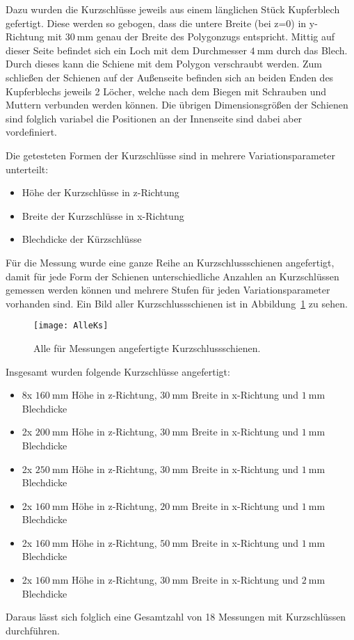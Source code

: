 Dazu wurden die Kurzschl\"usse jeweils aus einem l\"anglichen St\"uck Kupferblech gefertigt. Diese werden so gebogen, dass die untere Breite (bei z=0) in y-Richtung mit $\SI{30}{\milli\meter}$ genau der Breite des Polygonzugs entspricht. Mittig auf dieser Seite befindet sich ein Loch mit dem Durchmesser $\SI{4}{\milli\meter}$ durch das Blech. Durch dieses kann die Schiene mit dem Polygon verschraubt werden. Zum schlie\ss{}en der Schienen auf der Au\ss{}enseite befinden sich an beiden Enden des Kupferblechs jeweils 2 L\"ocher, welche nach dem Biegen mit Schrauben und Muttern verbunden werden k\"onnen. Die \"ubrigen Dimensionsgr\"o\ss{}en der Schienen sind folglich variabel die Positionen an der Innenseite sind dabei aber vordefiniert.
\par
Die getesteten Formen der Kurzschl\"usse sind in mehrere Variationsparameter unterteilt:
\begin{itemize}
	\item H\"ohe der Kurzschl\"usse in z-Richtung
	\item Breite der Kurzschl\"usse in x-Richtung
	\item Blechdicke der K\"urzschl\"usse
\end{itemize}

F\"ur die Messung wurde eine ganze Reihe an Kurzschlussschienen angefertigt, damit f\"ur jede Form der Schienen unterschiedliche Anzahlen an Kurzschl\"ussen gemessen werden k\"onnen und mehrere Stufen f\"ur jeden Variationsparameter vorhanden sind. Ein Bild aller Kurzschlussschienen ist in Abbildung~\ref{fig:AlleKs} zu sehen.
\par
\begin{figure}[htb]
	\centering
	\texttt{[image: AlleKs]}
	\caption{Alle f\"ur Messungen angefertigte Kurzschlussschienen.}
	\label{fig:AlleKs}
\end{figure}
Insgesamt wurden folgende Kurzschl\"usse angefertigt:
\par
\begin{itemize}
	\item 8x $\SI{160}{\milli\meter}$ H\"ohe in z-Richtung, $\SI{30}{\milli\meter}$ Breite in x-Richtung und $\SI{1}{\milli\meter}$ Blechdicke
	\item 2x $\SI{200}{\milli\meter}$ H\"ohe in z-Richtung, $\SI{30}{\milli\meter}$ Breite in x-Richtung und $\SI{1}{\milli\meter}$ Blechdicke
	\item 2x $\SI{250}{\milli\meter}$ H\"ohe in z-Richtung, $\SI{30}{\milli\meter}$ Breite in x-Richtung und $\SI{1}{\milli\meter}$ Blechdicke
	\item 2x $\SI{160}{\milli\meter}$ H\"ohe in z-Richtung, $\SI{20}{\milli\meter}$ Breite in x-Richtung und $\SI{1}{\milli\meter}$ Blechdicke
	\item 2x $\SI{160}{\milli\meter}$ H\"ohe in z-Richtung, $\SI{50}{\milli\meter}$ Breite in x-Richtung und $\SI{1}{\milli\meter}$ Blechdicke
	\item 2x $\SI{160}{\milli\meter}$ H\"ohe in z-Richtung, $\SI{30}{\milli\meter}$ Breite in x-Richtung und $\SI{2}{\milli\meter}$ Blechdicke
\end{itemize}
Daraus l\"asst sich folglich eine Gesamtzahl von 18 Messungen mit Kurzschl\"ussen durchf\"uhren. 

